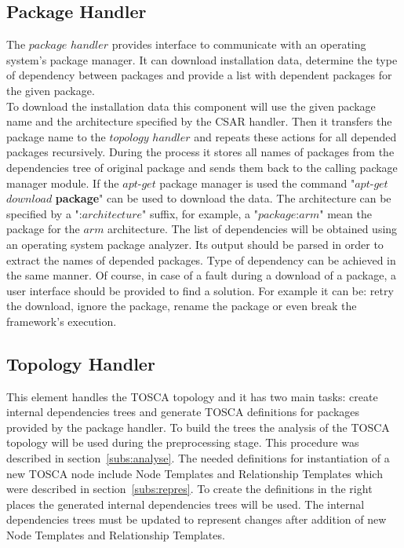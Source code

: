 \subsection{Package Handler} \label{subs:archph}
The $package$ $handler$ provides interface to communicate with an operating system's package manager. 
It can download installation data, determine the type of dependency between packages and provide a list with dependent packages for the given package. \\
To download the installation data this component will use the given package name and the architecture specified by the CSAR handler.
Then it transfers the package name to the $topology$ $handler$ and repeats these actions for all depended packages recursively. 
During the process it stores all names of packages from the dependencies tree of original package and sends them back to the calling package manager module.
If the $apt$-$get$ package manager is used  the command "$apt$-$get$ $download$ \textbf{package}" can be used to download the data. 
The architecture can be specified by a ":$architecture$" suffix, for example, a "$package$:$arm$" mean the package for the $arm$ architecture.
The list of dependencies will be obtained using an operating system package analyzer. %
Its output should be parsed in order to extract the names of depended packages.
Type of dependency can be achieved in the same manner.
Of course, in case of a fault during a download of a package, a user interface should be provided to find a solution.
For example it can be: retry the download, ignore the package, rename the package or even break the framework's execution.

\subsection{Topology Handler} \label{subs:archtop}
This element handles the TOSCA topology and it has two main tasks: create internal dependencies trees and generate TOSCA definitions for packages provided by the package handler.
To build the trees the analysis of the TOSCA topology will be used during the preprocessing stage.
This procedure was described in section~\ref{subs:analyse}.
The needed definitions for instantiation of a new TOSCA node include Node Templates and Relationship Templates which were described in section~\ref{subs:repres}.
To create the definitions in the right places the generated internal dependencies trees will be used.
The internal dependencies trees must be updated to represent changes after addition of new Node Templates and Relationship Templates.
